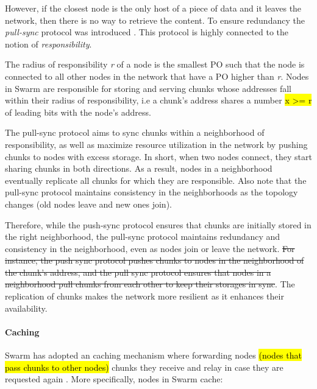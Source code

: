 However, if the closest node is the only host of a piece of data and it leaves the network, then there is no way to retrieve the content. To ensure redundancy the \textit{pull-sync} protocol was introduced \citep{swarm_team_2021}. This protocol is highly connected to the notion of \textit{responsibility}.

The radius of responsibility \textit{r} of a node is the smallest PO such that the node is connected to all other nodes in the network that have a PO higher than \textit{r}. Nodes in Swarm are responsible for storing and serving chunks whose addresses fall within their radius of responsibility, i.e a chunk's address shares a number \hl{x >= r} of leading bits with the node's address.

The pull-sync protocol aims to sync chunks within a neighborhood of responsibility, as well as maximize resource utilization in the network by pushing chunks to nodes with excess storage. In short, when two nodes connect, they start sharing chunks in both directions. As a result, nodes in a neighborhood eventually replicate all chunks for which they are responsible. Also note that the pull-sync protocol maintains consistency in the neighborhoods as the topology changes (old nodes leave and new ones join).

Therefore, while the push-sync protocol ensures that chunks are initially stored in the right neighborhood, the pull-sync protocol maintains redundancy and consistency in the neighborhood, even as nodes join or leave the network. \sout{For instance, the push sync protocol pushes chunks to nodes in the neighborhood of the chunk's address, and the pull sync protocol ensures that nodes in a neighborhood pull chunks from each other to keep their storages in sync}. The replication of chunks makes the network more resilient as it enhances their availability.

\paragraph{Caching}\label{par:caching_swarm}
Swarm has adopted an  caching mechanism where forwarding nodes \hl{(nodes that pass chunks to other nodes)}  chunks they receive and relay in case they are requested again \citep[p.~47]{tron_2020}. More specifically, nodes in Swarm cache:

